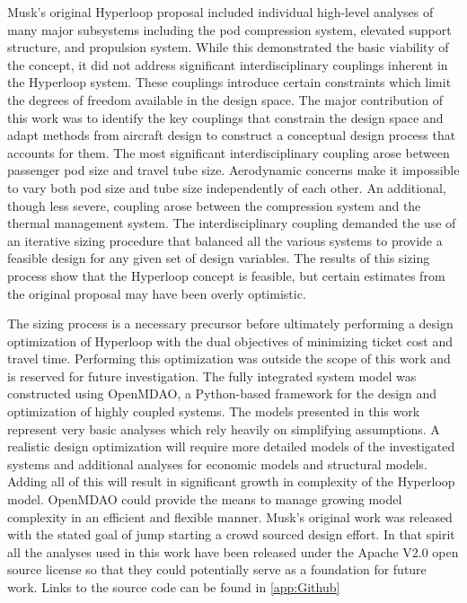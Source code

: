 \documentclass[heading.tex]{subfiles}
\begin{document}
Musk's original Hyperloop proposal included individual high-level analyses of many major subsystems including the pod compression system,
elevated support structure, and propulsion system. While this demonstrated the basic viability of the concept, it did not address
significant interdisciplinary couplings inherent in the Hyperloop system. These couplings introduce certain constraints which limit the 
degrees of freedom available in the design space. The major contribution of this work was to identify the key couplings that constrain the design space
and adapt methods from aircraft design to construct a conceptual design process that accounts for them. The most significant 
interdisciplinary coupling arose between passenger pod size and travel tube size. Aerodynamic concerns make it impossible to vary 
both pod size and tube size independently of each other. An additional, though less severe, coupling arose between the compression system and 
the thermal management system. The interdisciplinary coupling demanded the use of an iterative sizing procedure that balanced 
all the various systems to provide a feasible design for any given set of design variables. The results of this sizing process show that
the Hyperloop concept is feasible, but certain estimates from the original proposal may have been overly optimistic. 

The sizing process is a necessary precursor before ultimately performing a design optimization of 
Hyperloop with the dual objectives of minimizing ticket cost and travel time. Performing this optimization 
was outside the scope of this work and is reserved for future investigation. 
The fully integrated system model was constructed using OpenMDAO, a Python-based framework for 
the design and optimization of highly coupled systems\cite{GrayBenchmarking2013}. The models presented 
in this work represent very basic analyses which rely heavily on simplifying assumptions. A realistic design 
optimization will require more detailed models of the investigated systems and additional analyses for economic models and 
structural models. Adding all of this will result in significant growth in complexity of the Hyperloop model. 
OpenMDAO could provide the means to manage growing model complexity 
in an efficient and flexible manner. Musk's original work was released with the stated goal of jump starting
a crowd sourced design effort. In that spirit all the analyses used in this work have been released under
the Apache V2.0 open source license so that they could potentially serve as a foundation for future work. 
Links to the source code can be found in \cref{app:Github}
\end{document}
